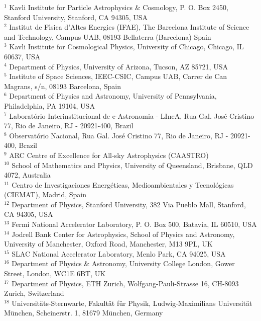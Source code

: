 $^{1}$ Kavli Institute for Particle Astrophysics \& Cosmology, P. O. Box 2450, Stanford University, Stanford, CA 94305, USA\\
$^{2}$ Institut de F\'{\i}sica d'Altes Energies (IFAE), The Barcelona Institute of Science and Technology, Campus UAB, 08193 Bellaterra (Barcelona) Spain\\
$^{3}$ Kavli Institute for Cosmological Physics, University of Chicago, Chicago, IL 60637, USA\\
$^{4}$ Department of Physics, University of Arizona, Tucson, AZ 85721, USA\\
$^{5}$ Institute of Space Sciences, IEEC-CSIC, Campus UAB, Carrer de Can Magrans, s/n,  08193 Barcelona, Spain\\
$^{6}$ Department of Physics and Astronomy, University of Pennsylvania, Philadelphia, PA 19104, USA\\
$^{7}$ Laborat\'orio Interinstitucional de e-Astronomia - LIneA, Rua Gal. Jos\'e Cristino 77, Rio de Janeiro, RJ - 20921-400, Brazil\\
$^{8}$ Observat\'orio Nacional, Rua Gal. Jos\'e Cristino 77, Rio de Janeiro, RJ - 20921-400, Brazil\\
$^{9}$ ARC Centre of Excellence for All-sky Astrophysics (CAASTRO)\\
$^{10}$ School of Mathematics and Physics, University of Queensland,  Brisbane, QLD 4072, Australia\\
$^{11}$ Centro de Investigaciones Energ\'eticas, Medioambientales y Tecnol\'ogicas (CIEMAT), Madrid, Spain\\
$^{12}$ Department of Physics, Stanford University, 382 Via Pueblo Mall, Stanford, CA 94305, USA\\
$^{13}$ Fermi National Accelerator Laboratory, P. O. Box 500, Batavia, IL 60510, USA\\
$^{14}$ Jodrell Bank Center for Astrophysics, School of Physics and Astronomy, University of Manchester, Oxford Road, Manchester, M13 9PL, UK\\
$^{15}$ SLAC National Accelerator Laboratory, Menlo Park, CA 94025, USA\\
$^{16}$ Department of Physics \& Astronomy, University College London, Gower Street, London, WC1E 6BT, UK\\
$^{17}$ Department of Physics, ETH Zurich, Wolfgang-Pauli-Strasse 16, CH-8093 Zurich, Switzerland\\
$^{18}$ Universit\"ats-Sternwarte, Fakult\"at f\"ur Physik, Ludwig-Maximilians Universit\"at M\"unchen, Scheinerstr. 1, 81679 M\"unchen, Germany\\
